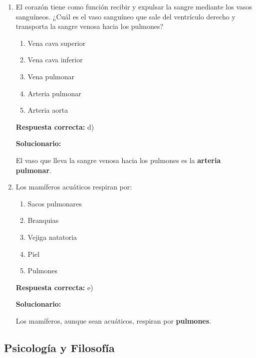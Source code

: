 \begin{enumerate}[resume]
	
	\item El corazón tiene como función recibir y expulsar la sangre mediante los vasos sanguíneos. ¿Cuál es el vaso sanguíneo que sale del ventrículo derecho y transporta la sangre venosa hacia los pulmones?
	\begin{enumerate}[label=\alph*)]
		\item Vena cava superior
		\item Vena cava inferior
		\item Vena pulmonar
		\item Arteria pulmonar
		\item Arteria aorta
	\end{enumerate}
	\textbf{Respuesta correcta:} d)
	
	\vspace{2mm}
	\textbf{Solucionario:}
	
	El vaso que lleva la sangre venosa hacia los pulmones es la \textbf{arteria pulmonar}.
	
	\vspace{6mm}
	
	\item Los mamíferos acuáticos respiran por:
	\begin{enumerate}[label=\alph*)]
		\item Sacos pulmonares
		\item Branquias
		\item Vejiga natatoria
		\item Piel
		\item Pulmones
	\end{enumerate}
	\textbf{Respuesta correcta:} e)
	
	\vspace{2mm}
	\textbf{Solucionario:}
	
	Los mamíferos, aunque sean acuáticos, respiran por \textbf{pulmones}.
	
	\vspace{6mm}
	
\end{enumerate}

\subsection*{Psicología y Filosofía}

